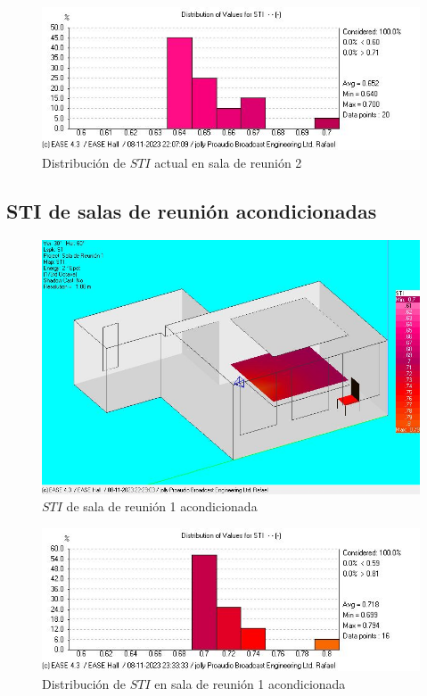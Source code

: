 \begin{figure}[H]
    \centering
    \includegraphics[width=12cm]{Imagenes/STI actual/STIdist_Reunion2_SinAcond.jpg}
    \caption{Distribución de $STI$ actual en sala de reunión 2}
    \label{fig: distribucion STI sala2 actual}
\end{figure}

\subsection{STI de salas de reunión acondicionadas}\label{subsecc: STI salas acond}
\begin{figure}[H]
    \centering
    \includegraphics[width=12cm]{Imagenes/STI acondicionado/STI_Reunion1_ConAcond.jpg}
    \caption{$STI$ de sala de reunión 1 acondicionada}
    \label{fig: STI sala1 acond}
\end{figure}
\begin{figure}[H]
    \centering
    \includegraphics[width=12cm]{Imagenes/STI acondicionado/STIdist_Reunion1_ConAcond.jpg}
    \caption{Distribución de $STI$ en sala de reunión 1 acondicionada}
    \label{fig: distribucion STI sala1 acond}
\end{figure}

